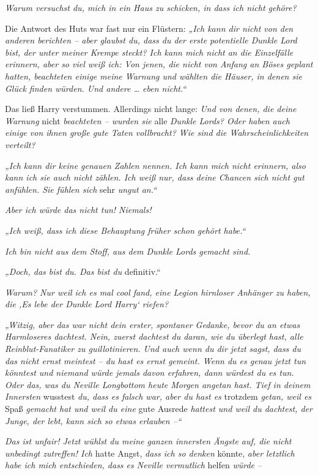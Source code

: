 \emph{Warum versuchst du, mich in ein Haus zu schicken, in dass ich nicht gehöre?} 

Die Antwort des Huts war fast nur ein Flüstern: \emph{„Ich kann dir nicht von den anderen berichten – aber glaubst du, dass du der erste potentielle Dunkle Lord bist, der unter meiner Krempe steckt? Ich kann mich nicht an die Einzelfälle erinnern, aber so viel weiß ich: Von jenen, die nicht von Anfang an Böses geplant hatten, beachteten einige meine Warnung und wählten die Häuser, in denen sie Glück finden würden. Und andere … eben nicht.“} 

Das ließ Harry verstummen. Allerdings nicht lange: \emph{Und von denen, die deine Warnung }nicht\emph{ beachteten – wurden sie }alle\emph{ Dunkle Lords? Oder haben auch einige von ihnen große gute Taten vollbracht? Wie sind die Wahrscheinlichkeiten verteilt? }

\emph{„Ich kann dir keine genauen Zahlen nennen. Ich kann mich nicht erinnern, also kann ich sie auch nicht zählen. Ich weiß nur, dass deine Chancen sich nicht gut anfühlen. Sie fühlen sich }sehr\emph{ ungut an.“ }

\emph{Aber ich würde das nicht tun! Niemals! }

\emph{„Ich weiß, dass ich diese Behauptung früher schon gehört habe.“ }

\emph{Ich bin nicht aus dem Stoff, aus dem Dunkle Lords gemacht sind. }

\emph{„Doch, das bist du. Das bist du }definitiv.“\emph{ }

\emph{Warum? Nur weil ich es mal cool fand, eine Legion hirnloser Anhänger zu haben, die ‚Es lebe der Dunkle Lord Harry‘ riefen? }

\emph{„Witzig, aber das war nicht dein erster, spontaner Gedanke, bevor du an etwas Harmloseres dachtest. Nein, zuerst dachtest du daran, wie du überlegt hast, alle Reinblut-Fanatiker zu guillotinieren. Und auch wenn du dir jetzt sagst, dass du das nicht ernst meintest – du hast es ernst gemeint. Wenn du es genau jetzt tun könntest und niemand würde jemals davon erfahren, dann würdest du es tun. Oder das, was du Neville Longbottom heute Morgen angetan hast. Tief in deinem Innersten }wusstest\emph{ du, dass es falsch war, aber du hast es }trotzdem\emph{ getan, weil es }Spaß\emph{ gemacht hat und weil du eine }gute Ausrede\emph{ hattest und weil du dachtest, der Junge, der lebt, kann sich so etwas erlauben –“ }

\emph{Das ist unfair! Jetzt wühlst du meine ganzen innersten Ängste auf, die nicht unbedingt zutreffen! Ich }hatte Angst,\emph{ dass ich so denken }könnte,\emph{ aber letztlich habe ich mich entschieden, dass es Neville vermutlich }helfen\emph{ würde – }

